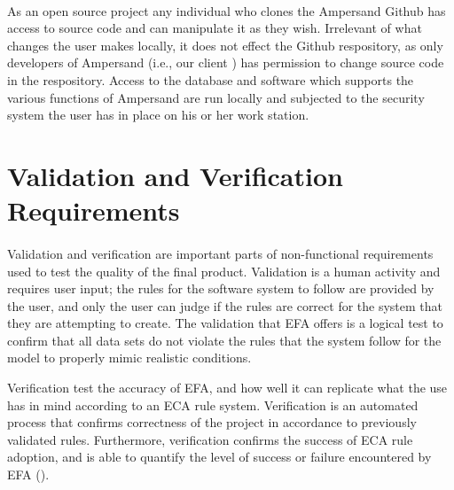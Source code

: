 \documentclass[12pt]{report}
\begin{document}
\paragraph*{}
As an open source project any individual who clones the Ampersand Github has access to source code 
and can manipulate it as they wish. Irrelevant of what changes the user makes locally, it does not 
effect the Github respository, as only developers of Ampersand \big(i.e., our client \big) has 
permission to change source code in the respository. Access to the database and software which 
supports the various functions of Ampersand are run locally and subjected to the security system 
the user has in place on his or her work station.

	
\section{Validation and Verification Requirements}\label{sec:Verification}

\paragraph*{}
Validation and verification are important parts of non-functional requirements used to test the 
quality of the final product. Validation is a human activity and requires user input; the rules for 
the software system to follow are provided by the user, and only the user can judge if the rules 
are correct for the system that they are attempting to create. The validation that EFA offers is 
a logical test to confirm that all data sets do not violate the rules that the system follow for 
the model to properly mimic realistic conditions. 

Verification test the accuracy of EFA, and how well it can replicate what the use has in mind 
according to an ECA rule system. Verification is an automated process that confirms correctness 
of the project in accordance to previously validated rules. Furthermore, verification confirms the 
success of ECA rule adoption, and is able to quantify the level of success or failure 
encountered by EFA (\cite{RBD}). 
\end{document}
